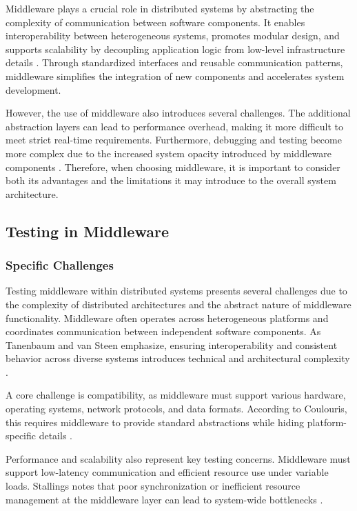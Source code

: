 Middleware plays a crucial role in distributed systems by abstracting the complexity of communication between software components. It enables interoperability between heterogeneous systems, promotes modular design, and supports scalability by decoupling application logic from low-level infrastructure details \cite{josuttis2007, coulouris2012}. Through standardized interfaces and reusable communication patterns, middleware simplifies the integration of new components and accelerates system development.

\vspace{1em}
However, the use of middleware also introduces several challenges. The additional abstraction layers can lead to performance overhead, making it more difficult to meet strict real-time requirements. Furthermore, debugging and testing become more complex due to the increased system opacity introduced by middleware components \cite{josuttis2007, coulouris2012}. Therefore, when choosing middleware, it is important to consider both its advantages and the limitations it may introduce to the overall system architecture.


\newpage
\subsection{Testing in Middleware}

\subsubsection{Specific Challenges}

Testing middleware within distributed systems presents several challenges due to the complexity of distributed architectures and the abstract nature of middleware functionality. Middleware often operates across heterogeneous platforms and coordinates communication between independent software components. As Tanenbaum and van Steen emphasize, ensuring interoperability and consistent behavior across diverse systems introduces technical and architectural complexity \cite{tanenbaum2017}.

\vspace{1em}
A core challenge is compatibility, as middleware must support various hardware, operating systems, network protocols, and data formats. According to Coulouris, this requires middleware to provide standard abstractions while hiding platform-specific details \cite{coulouris2012}. 

\vspace{1em}
Performance and scalability also represent key testing concerns. Middleware must support low-latency communication and efficient resource use under variable loads. Stallings notes that poor synchronization or inefficient resource management at the middleware layer can lead to system-wide bottlenecks \cite{stallings2018}.

